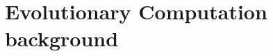 \documentclass[10pt,compress]{beamer} %
\begin{document}


\section{Evolutionary Computation background}
\end{document}

